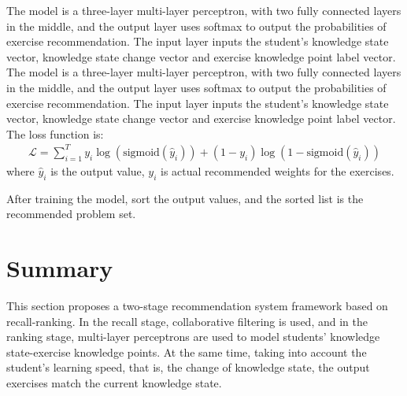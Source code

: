 The model is a three-layer multi-layer perceptron, with two fully connected layers in the middle, and the output layer uses softmax to output the probabilities of exercise recommendation. The input layer inputs the student's knowledge state vector, knowledge state change vector and exercise knowledge point label vector. The model is a three-layer multi-layer perceptron, with two fully connected layers in the middle, and the output layer uses softmax to output the probabilities of exercise recommendation. The input layer inputs the student's knowledge state vector, knowledge state change vector and exercise knowledge point label vector. The loss function is:
\begin{align}
  \mathcal{L}=\sum_{i=1}^{T} y_i \log \left(\text{sigmoid}\left(\hat{y}_i\right)\right)+\left(1-y_i \right) \log (1-\text{sigmoid}(\hat{y}_i))
\end{align}
where $\hat{y}_i$ is the output value, $y_i$ is actual recommended weights for the exercises.

After training the model, sort the output values, and the sorted list is the recommended problem set.


\section{Summary}
This section proposes a two-stage recommendation system framework based on recall-ranking. In the recall stage, collaborative filtering is used, and in the ranking stage, multi-layer perceptrons are used to model students' knowledge state-exercise knowledge points. At the same time, taking into account the student’s learning speed, that is, the change of knowledge state, the output exercises match the current knowledge state.